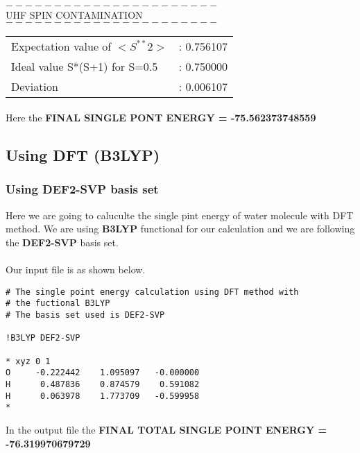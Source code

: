 $----------------------$ \\
UHF SPIN CONTAMINATION \\
$----------------------$\\


\begin{tabular}{l l}


Expectation value of $<S^{**}2>$     &:     0.756107 \\
Ideal value S*(S+1) for S=0.5   &:     0.750000 \\
Deviation                       &:     0.006107 \\

\end{tabular}
\paragraph{}

Here the \textbf{FINAL SINGLE PONT ENERGY = -75.562373748559}

\subsection{Using DFT (B3LYP)}

\subsubsection{Using DEF2-SVP basis set}

Here we are going to caluculte the single pint energy of water molecule with DFT method. We are using \textbf{B3LYP} functional for our calculation and we are following the \textbf{DEF2-SVP} basis set. 
\paragraph{}
Our input file is as shown below.

\begin{verbatim}
# The single point energy calculation using DFT method with 
# the fuctional B3LYP
# The basis set used is DEF2-SVP

!B3LYP DEF2-SVP

* xyz 0 1
O     -0.222442    1.095097   -0.000000
H      0.487836    0.874579    0.591082
H      0.063978    1.773709   -0.599958
*

\end{verbatim}

In the output file the \textbf{FINAL TOTAL SINGLE POINT ENERGY = -76.319970679729}

